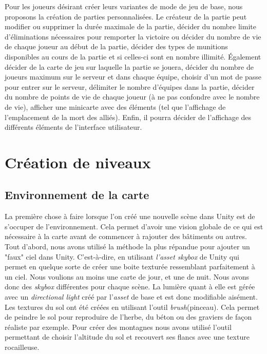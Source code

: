 \documentclass[12pt, titlepage]{article}
\begin{document}
\begin{spacing}{1.5}
Pour les joueurs désirant créer leurs variantes de mode de jeu de base, nous proposons la création de parties personnalisées. Le créateur de la partie peut modifier ou supprimer la durée maximale de la partie, décider du nombre limite d'éliminations nécessaires pour remporter la victoire ou décider du nombre de vie de chaque joueur au début de la partie, décider des types de munitions disponibles au cours de la partie et si celles-ci sont en nombre illimité. Également décider de la carte de jeu sur laquelle la partie se jouera, décider du nombre de joueurs maximum sur le serveur et dans chaque équipe, choisir d'un mot de passe pour entrer sur le serveur, délimiter le nombre d'équipes dans la partie, décider du nombre de points de vie de chaque joueur (à ne pas confondre avec le nombre de vie), afficher une minicarte avec des éléments (tel que l'affichage de l'emplacement de la mort des alliés). Enfin, il pourra décider de l'affichage des différents éléments de l'interface utilisateur. \\

\newpage
\section{Création de niveaux}

\subsection{Environnement de la carte}
La première chose à faire lorsque l’on créé une nouvelle scène dans Unity est de s’occuper de l’environnement. Cela permet d’avoir une vision globale de ce qui est nécessaire à la carte avant de commencer à rajouter des bâtiments ou autres.\\

Tout d’abord, nous avons utilisé la méthode la plus répandue pour ajouter un "faux" ciel dans Unity. C’est-à-dire, en utilisant \textit{l'asset skybox} de Unity qui permet en quelque sorte de créer une boite texturée ressemblant parfaitement à un ciel. Nous voulions au moins une carte de jour, et une de nuit. Nous avons donc des \textit{skybox} différentes pour chaque scène. La lumière quant à elle est gérée avec un \textit{directional light} créé par l'\textit{asset} de base et est donc modifiable aisément.\\

Les textures du sol ont été créées en utilisant l'outil \textit{brush}(pinceau). Cela permet de peindre le sol pour reproduire de l’herbe, du béton ou des graviers de façon réaliste par exemple. Pour créer des montagnes nous avons utilisé l’outil permettant de choisir l’altitude du sol et recouvert ses flancs avec une texture rocailleuse.\\


\end{spacing}
\end{document}
